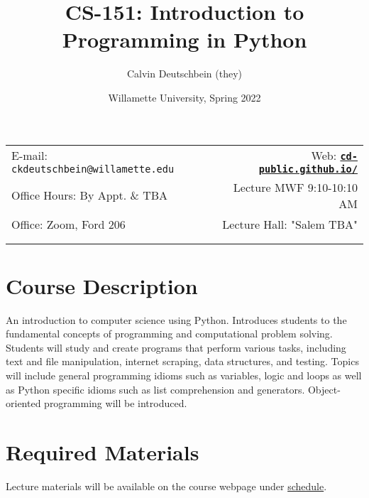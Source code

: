 \documentclass[11pt]{article}
\title{CS-151: Introduction to Programming in Python}
\author{Calvin Deutschbein (they)}
\date{Willamette University, Spring 2022}
\newcommand{\blankline}{\quad\pagebreak[2]}
\begin{document}
\maketitle

\blankline

\begin{tabular*}{.93\textwidth}{@{\extracolsep{\fill}}lr}


E-mail: \texttt{ckdeutschbein@willamette.edu} & Web: \href{https://cd-public.github.io/courses/intro/151s22.html}{\tt\bf cd-public.github.io/}  \\

 Office Hours: By Appt. \& TBA  &  Lecture MWF 9:10-10:10 AM \\

 Office: Zoom, Ford 206 & Lecture Hall: "Salem TBA" \\
 & \\
&  \\
\hline
\end{tabular*}

\vspace{5 mm}


\section*{Course Description}

An introduction to computer science using Python. Introduces students to the fundamental concepts of programming and computational problem solving. Students will study and create programs that perform various tasks, including text and file manipulation, internet scraping, data structures, and testing. Topics will include general programming idioms such as variables, logic and loops as well as Python specific idioms such as list comprehension and generators. Object-oriented programming will be introduced. 


\section*{Required Materials}

Lecture materials will be available on the course webpage under \href{https://cd-public.github.io/courses/intro/s-151f22.html}{schedule}.
\end{document}
